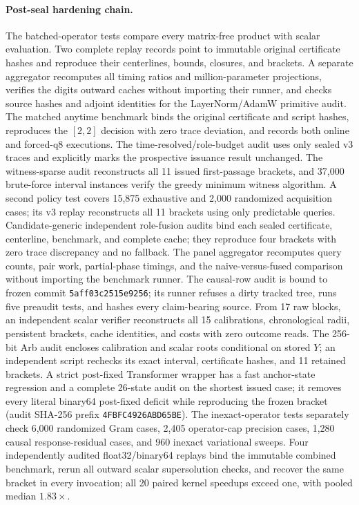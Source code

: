 \documentclass{article}
\begin{document}
\paragraph{Post-seal hardening chain.}
The batched-operator tests compare every matrix-free product with scalar
evaluation.  Two complete replay records point to immutable original
certificate hashes and reproduce their centerlines, bounds, closures, and
brackets.  A separate aggregator recomputes all timing ratios and
million-parameter projections, verifies the digits outward caches without
importing their runner, and checks source hashes and adjoint identities for the
LayerNorm/AdamW primitive audit.
The matched anytime benchmark binds the original certificate and script hashes,
reproduces the $[2,2]$ decision with zero trace deviation, and records both
online and forced-q8 executions.  The time-resolved/role-budget audit uses only
sealed v3 traces and explicitly marks the prospective issuance result
unchanged.  The witness-sparse audit reconstructs all 11 issued first-passage
brackets, and 37,000 brute-force interval instances verify the greedy minimum
witness algorithm.  A second policy test covers 15,875 exhaustive and 2,000
randomized acquisition cases; its v3 replay reconstructs all 11 brackets using
only predictable queries.  Candidate-generic independent role-fusion audits
bind each sealed certificate, centerline, benchmark, and complete cache; they
reproduce four brackets with zero trace discrepancy and no fallback.  The
panel aggregator recomputes query counts, pair work, partial-phase timings,
and the naive-versus-fused comparison without importing the benchmark runner.
The causal-row audit is bound to frozen commit
\texttt{5aff03c2515e9256}; its runner refuses a dirty tracked tree, runs five
preaudit tests, and hashes every claim-bearing source.  From 17 raw blocks, an
independent scalar verifier reconstructs all 15 calibrations, chronological
radii, persistent brackets, cache identities, and costs with zero outcome reads.
The 256-bit Arb audit encloses calibration and scalar roots conditional on
stored $Y$; an independent script rechecks its exact interval, certificate
hashes, and 11 retained brackets.  A strict post-fixed Transformer wrapper has
a fast
anchor-state regression and a complete 26-state audit on the shortest issued
case; it removes every literal binary64 post-fixed deficit while reproducing
the frozen bracket (audit SHA-256 prefix
\texttt{4FBFC4926ABD65BE}).
The inexact-operator tests separately check 6,000 randomized Gram cases,
2,405 operator-cap precision cases, 1,280 causal response-residual cases, and
960 inexact variational sweeps.  Four independently audited float32/binary64
replays bind the immutable combined benchmark, rerun all outward scalar
supersolution checks, and recover the same bracket in every invocation; all 20
paired kernel speedups exceed one, with pooled median $1.83\times$.
\end{document}
